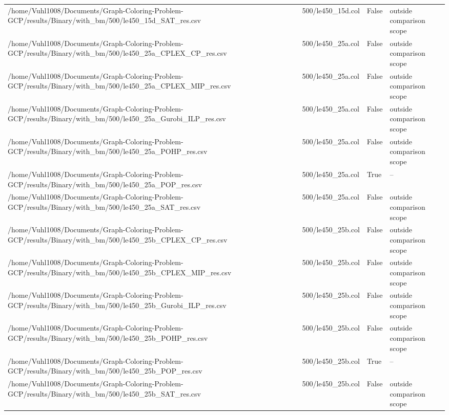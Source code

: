 \begin{table}[htbp]
\begin{tabular}{llll}
/home/Vuhl1008/Documents/Graph-Coloring-Problem-GCP/results/Binary/with\_bm/500/le450\_15d\_SAT\_res.csv & 500/le450\_15d.col & False & outside comparison scope \\
/home/Vuhl1008/Documents/Graph-Coloring-Problem-GCP/results/Binary/with\_bm/500/le450\_25a\_CPLEX\_CP\_res.csv & 500/le450\_25a.col & False & outside comparison scope \\
/home/Vuhl1008/Documents/Graph-Coloring-Problem-GCP/results/Binary/with\_bm/500/le450\_25a\_CPLEX\_MIP\_res.csv & 500/le450\_25a.col & False & outside comparison scope \\
/home/Vuhl1008/Documents/Graph-Coloring-Problem-GCP/results/Binary/with\_bm/500/le450\_25a\_Gurobi\_ILP\_res.csv & 500/le450\_25a.col & False & outside comparison scope \\
/home/Vuhl1008/Documents/Graph-Coloring-Problem-GCP/results/Binary/with\_bm/500/le450\_25a\_POHP\_res.csv & 500/le450\_25a.col & False & outside comparison scope \\
/home/Vuhl1008/Documents/Graph-Coloring-Problem-GCP/results/Binary/with\_bm/500/le450\_25a\_POP\_res.csv & 500/le450\_25a.col & True & -- \\
/home/Vuhl1008/Documents/Graph-Coloring-Problem-GCP/results/Binary/with\_bm/500/le450\_25a\_SAT\_res.csv & 500/le450\_25a.col & False & outside comparison scope \\
/home/Vuhl1008/Documents/Graph-Coloring-Problem-GCP/results/Binary/with\_bm/500/le450\_25b\_CPLEX\_CP\_res.csv & 500/le450\_25b.col & False & outside comparison scope \\
/home/Vuhl1008/Documents/Graph-Coloring-Problem-GCP/results/Binary/with\_bm/500/le450\_25b\_CPLEX\_MIP\_res.csv & 500/le450\_25b.col & False & outside comparison scope \\
/home/Vuhl1008/Documents/Graph-Coloring-Problem-GCP/results/Binary/with\_bm/500/le450\_25b\_Gurobi\_ILP\_res.csv & 500/le450\_25b.col & False & outside comparison scope \\
/home/Vuhl1008/Documents/Graph-Coloring-Problem-GCP/results/Binary/with\_bm/500/le450\_25b\_POHP\_res.csv & 500/le450\_25b.col & False & outside comparison scope \\
/home/Vuhl1008/Documents/Graph-Coloring-Problem-GCP/results/Binary/with\_bm/500/le450\_25b\_POP\_res.csv & 500/le450\_25b.col & True & -- \\
/home/Vuhl1008/Documents/Graph-Coloring-Problem-GCP/results/Binary/with\_bm/500/le450\_25b\_SAT\_res.csv & 500/le450\_25b.col & False & outside comparison scope \\

\end{tabular}
\end{table}
